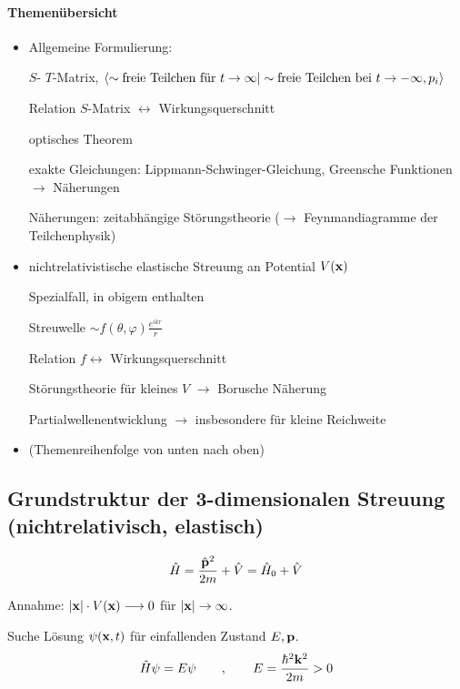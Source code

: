 \documentclass[11pt,a4paper]{report}
\begin{document}
\paragraph{Themenübersicht}
\begin{itemize}
\item Allgemeine Formulierung:\par 
$S$- $T$-Matrix, $\langle \sim\text{freie Teilchen für }t\rightarrow\infty | \sim\text{freie Teilchen bei }t\rightarrow -\infty , p_i \rangle$\par 
Relation $S$-Matrix $\leftrightarrow$ Wirkungsquerschnitt\par 
optisches Theorem\par 
exakte Gleichungen: Lippmann-Schwinger-Gleichung, Greensche Funktionen $\rightarrow$ Näherungen\par 
Näherungen: zeitabhängige Störungstheorie ($\rightarrow$ Feynmandiagramme der Teilchenphysik)
\item nichtrelativistische elastische Streuung an Potential $V(\mathbf{x})$\par 
Spezialfall, in obigem enthalten\par 
Streuwelle $\sim f(\theta ,\varphi )\frac{e^{ikr}}{r}$\par 
Relation $f \leftrightarrow $ Wirkungsquerschnitt\par 
Störungstheorie für kleines $V$ $\rightarrow$ Borusche Näherung\par 
Partialwellenentwicklung $\rightarrow$ insbesondere für kleine Reichweite
\item (Themenreihenfolge von unten nach oben)
\end{itemize}

\subsection{Grundstruktur der 3-dimensionalen Streuung (nichtrelativisch, elastisch)}

\newcommand{\ham}{\hat{H}}
\newcommand{\mom}{\hat{\vf{p}}}
\newcommand{\pot}{\hat{V}}
\newcommand{\vx}{\vf{x}}
\newcommand{\vp}{\vf{p}}
\newcommand{\vk}{\vf{k}}

$$\ham = \frac{\mom^2}{2m} + \pot = \ham_0 + \pot$$

Annahme: $|\vx |\cdot V(\vx )\longrightarrow 0$ für $|\vx |\rightarrow\infty$.\par 

\newcommand{\dep}{(\vx ,t)}

Suche Lösung $\psi\dep$ für einfallenden Zustand $E,\vp$.
$$\ham\psi = E\psi\qquad ,\qquad E=\frac{\hbar^2\vf{k}^2}{2m} > 0$$
\end{document}
